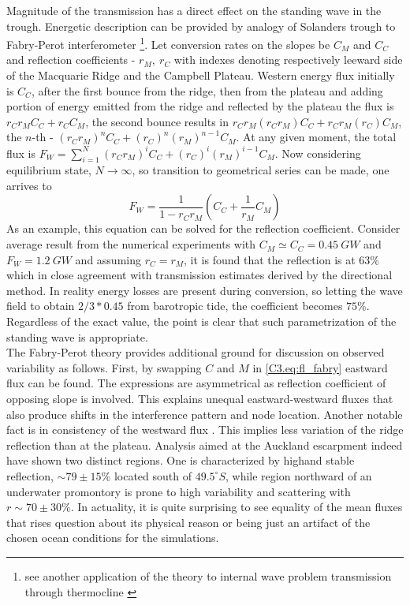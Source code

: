 \documentclass[12pt]{article}
\begin{document}
Magnitude of the transmission has a direct effect on the standing wave in the trough. 
Energetic description can be provided by analogy of Solanders trough to Fabry-Perot 
interferometer \footnote{see another application of the theory to internal wave problem 
transmission through thermocline \citep{peacok}}. Let conversion rates on the slopes be $C_M$ and 
$C_C$ and reflection coefficients - $r_M,~r_C$ with indexes denoting respectively leeward side of 
the Macquarie Ridge and the Campbell Plateau. Western energy flux initially is $C_C$, after the 
first bounce from the ridge, then from the plateau and adding portion of energy emitted from the 
ridge and reflected by the plateau the flux is $r_C r_M C_C + r_C C_M$, the second bounce results 
in $r_C r_M 
(r_C r_M) C_C + r_C r_M (r_C) C_M$, the $n$-th - $(r_C r_M)^n C_C + (r_C)^n (r_M)^{n-1} C_M$. At 
any given 
moment, the total flux is $F_W = \sum_{i = 1}^N (r_C r_M)^i C_C + (r_C)^i (r_M)^{i-1} C_M$. Now  
considering equilibrium state, $N \rightarrow \infty$, so transition to geometrical series can be  
made, one arrives to
\begin{equation}
\label{C3.eq:fl_fabry}
F_W = \frac{1}{1 - r_C r_M} (C_C + \frac{1}{r_M} C_M)
\end{equation}
As an example, this equation can be solved for the reflection coefficient. Consider average result 
from the numerical experiments  with $C_M \simeq C_C = 0.45~GW$ and 
$F_W = 1.2~GW$ and assuming $r_C = r_M$, it is found that the reflection is at $63\%$ which in 
close agreement with transmission estimates derived by the directional method. In reality 
energy losses are present during conversion, so letting the wave field to obtain $2/3*0.45$ from 
barotropic tide, the coefficient becomes $75\%$. Regardless of the exact value, the point is clear 
that such parametrization of the standing wave is appropriate.\\

The Fabry-Perot theory provides additional ground for discussion on observed variability  
 as follows. First, by swapping $C$ and $M$ in \eqref{C3.eq:fl_fabry} 
eastward flux can be found. The expressions are asymmetrical as reflection coefficient of opposing 
slope is involved. This explains unequal eastward-westward fluxes that also produce shifts 
in the interference pattern and node location. Another notable fact is in consistency of the 
westward flux . This implies less variation of the ridge reflection 
than at the plateau. Analysis aimed at the Auckland escarpment indeed have shown two distinct 
regions. 
One is characterized by highand stable reflection, $\sim 79 \pm 15 \%$ located south of 
$49.5^{\circ}S$, while region northward of an underwater promontory is prone to high variability 
and scattering with $r \sim 70 \pm 30\%$. In actuality, it is quite surprising to see 
equality of the mean fluxes that rises question about its physical reason or being just an artifact 
of the 
chosen ocean conditions for the simulations.\\
\end{document}
